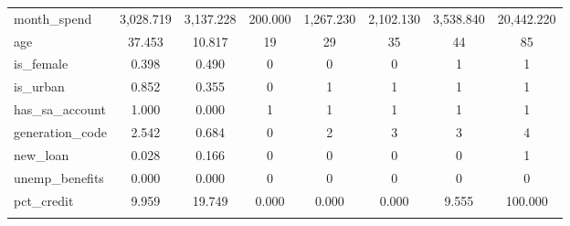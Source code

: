 \begin{table}[!htbp]
\begin{tabular}{@{\extracolsep{5pt}}lccccccc}
month\_spend & 3,028.719 & 3,137.228 & 200.000 & 1,267.230 & 2,102.130 & 3,538.840 & 20,442.220 \\ 
age & 37.453 & 10.817 & 19 & 29 & 35 & 44 & 85 \\ 
is\_female & 0.398 & 0.490 & 0 & 0 & 0 & 1 & 1 \\ 
is\_urban & 0.852 & 0.355 & 0 & 1 & 1 & 1 & 1 \\ 
has\_sa\_account & 1.000 & 0.000 & 1 & 1 & 1 & 1 & 1 \\ 
generation\_code & 2.542 & 0.684 & 0 & 2 & 3 & 3 & 4 \\ 
new\_loan & 0.028 & 0.166 & 0 & 0 & 0 & 0 & 1 \\ 
unemp\_benefits & 0.000 & 0.000 & 0 & 0 & 0 & 0 & 0 \\ 
pct\_credit & 9.959 & 19.749 & 0.000 & 0.000 & 0.000 & 9.555 & 100.000 \\ 
\hline \\[-1.8ex] 
\end{tabular} 
\end{table} 
